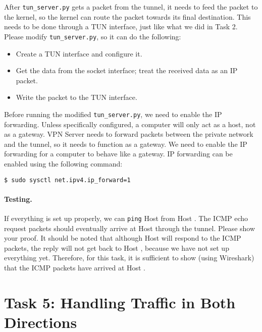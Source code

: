 After \texttt{tun\_server.py} gets a packet from the 
tunnel, it needs to feed the packet to the kernel, so
the kernel can route the packet towards its final destination. 
This needs to be done through a TUN interface, just like what 
we did in Task 2. Please modify \texttt{tun\_server.py}, so it 
can do the following: 


\begin{itemize}[noitemsep]
\item Create a TUN interface and configure it.

\item Get the data from the socket interface; treat the received data 
as an IP packet.

\item Write the packet to the TUN interface.

\end{itemize}
 

Before running the modified \texttt{tun\_server.py}, we need to enable the 
IP forwarding. 
Unless specifically configured, a computer will only act as a host, 
not as a gateway. VPN Server needs to forward packets between the private network and the 
tunnel, so it needs to function as a gateway. We need to  
enable the IP forwarding for a computer to behave like a gateway. 
IP forwarding can be enabled
using the following command:

\begin{lstlisting}
$ sudo sysctl net.ipv4.ip_forward=1
\end{lstlisting}

 

\paragraph{Testing.} If everything is set up properly, we can \texttt{ping}
Host \hostv from Host \hostu. The ICMP echo request packets should eventually arrive at Host \hostv
through the tunnel. 
Please show your proof. 
It should be noted that although Host \hostv will respond to the ICMP packets,
the reply will not get back to Host \hostu, because we have not set up everything yet. 
Therefore, for this task, it is sufficient to
show (using Wireshark) that the ICMP packets have arrived at Host \hostv.





\section{Task 5: Handling Traffic in Both Directions}


